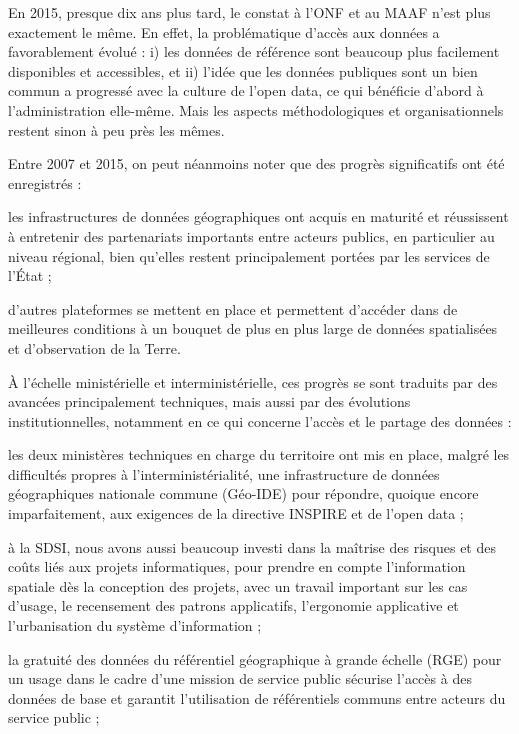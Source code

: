 En 2015, presque dix ans plus tard, le constat à l'ONF et au MAAF
n'est plus exactement le même.
En effet, la problématique d'accès aux données a favorablement évolué :
i) les données de référence sont beaucoup plus facilement disponibles et
accessibles, et ii) l'idée que les données publiques sont un bien commun a
progressé avec la culture de l'open data, ce qui bénéficie d'abord à
l'administration elle-même. Mais les aspects méthodologiques et
organisationnels restent sinon à peu près les mêmes.

Entre 2007 et 2015, on peut néanmoins noter que des progrès significatifs ont
été enregistrés :

\startitemize

\item les infrastructures de données géographiques ont acquis en maturité et
réussissent à entretenir des partenariats importants entre acteurs publics, en
particulier au niveau régional, bien qu'elles restent principalement portées
par les services de l'État ;

\item d'autres plateformes se mettent en place et permettent d'accéder dans de
meilleures conditions à un bouquet de plus en plus large de données
spatialisées et d'observation de la Terre.

\stopitemize

À l'échelle ministérielle et interministérielle, ces progrès se sont traduits
par des avancées principalement techniques, mais aussi par des évolutions
institutionnelles, notamment en ce qui concerne l'accès et le partage des
données :

\startitemize

\item les deux ministères techniques en charge du territoire ont mis en place,
malgré les difficultés propres à l’interministérialité, une infrastructure de
données géographiques nationale commune (Géo-IDE) pour répondre, quoique
encore imparfaitement, aux exigences de la directive INSPIRE et de l'open data ;

\item à la SDSI, nous avons aussi beaucoup investi dans la maîtrise des risques et
des coûts liés aux projets informatiques, pour prendre en compte l'information
spatiale dès la conception des projets, avec un travail important sur les cas
d'usage, le recensement des patrons applicatifs, l'ergonomie applicative et
l'urbanisation du système d'information ;

\item la gratuité des données du référentiel géographique à grande échelle (RGE)
pour un usage dans le cadre d'une mission de service public sécurise l'accès à
des données de base et garantit l'utilisation de référentiels communs entre
acteurs du service public ;

